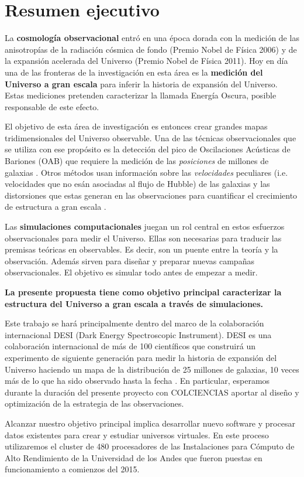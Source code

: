 
\section{Resumen ejecutivo}

La {\bf cosmología observacional} entró en una época dorada con la medición
de las anisotropías de la radiación cósmica de fondo (Premio Nobel de
Física 2006) y de la expansión acelerada del Universo
(Premio Nobel de Física 2011).  
Hoy en d\'ia una de las fronteras de la investigación en esta \'area 
es la {\bf medici\'on del Universo a gran escala} para inferir la
historia de expansión  del Universo.   Estas mediciones pretenden
caracterizar la llamada Energ\'ia Oscura, posible responsable de este
efecto.   

El objetivo de esta \'area de investigaci\'on es entonces crear
grandes mapas tridimensionales del Universo observable. 
Una de las t\'ecnicas observacionales que se utiliza con ese
prop\'osito es la detecci\'on del pico de Oscilaciones Ac\'usticas de
Bariones (OAB) que requiere la medici\'on de las \emph{posiciones} de
millones de galaxias \cite{Eisenstein2005}. 
Otros m\'etodos usan informaci\'on sobre las \emph{velocidades}
peculiares (i.e. velocidades que no es\'an asociadas al flujo de
Hubble) de las galaxias y las distorsiones que estas generan en las
observaciones para cuantificar el crecimiento de estructura a gran
escala \cite{Scoccimarro2004}. 

Las {\bf simulaciones computacionales} juegan un rol central en estos
esfuerzos observacionales para medir el Universo.
Ellas son necesarias para traducir las premisas te\'oricas
en observables. 
Es decir, son un puente entre la teor\'ia y la  observaci\'on. 
Adem\'as sirven para dise\~nar y preparar 
nuevas campa\~nas observacionales.  
El objetivo es simular todo antes de empezar a medir. 


{\bf La presente propuesta tiene como objetivo principal caracterizar
  la estructura del Universo a gran escala a trav\'es de simulaciones.}
  

Este trabajo se har\'a principalmente dentro del marco de la
colaboraci\'on internacional DESI (Dark Energy Spectroscopic
Instrument).  DESI es una colaboraci\'on internacional de m\'as de 100
cient\'ificos que construir\'a un experimento de siguiente
generaci\'on para medir la historia de expansi\'on del Universo
haciendo un mapa de la  distribuci\'on de 25 millones de galaxias, 10
veces m\'as de lo que ha sido observado hasta la fecha \cite{DESI}. 
En particular, esperamos durante la duraci\'on del presente proyecto
con COLCIENCIAS aportar al dise\~no y optimizaci\'on de la estrategia
de las observaciones.  

Alcanzar nuestro objetivo principal implica desarrollar nuevo software
y procesar datos existentes para crear y estudiar universos virtuales.
En este proceso utilizaremos el cluster de 480 procesadores de
las Instalaciones para C\'omputo de Alto Rendimiento de  la
Universidad de los Andes que fueron puestas en funcionamiento a
comienzos del 2015. 
